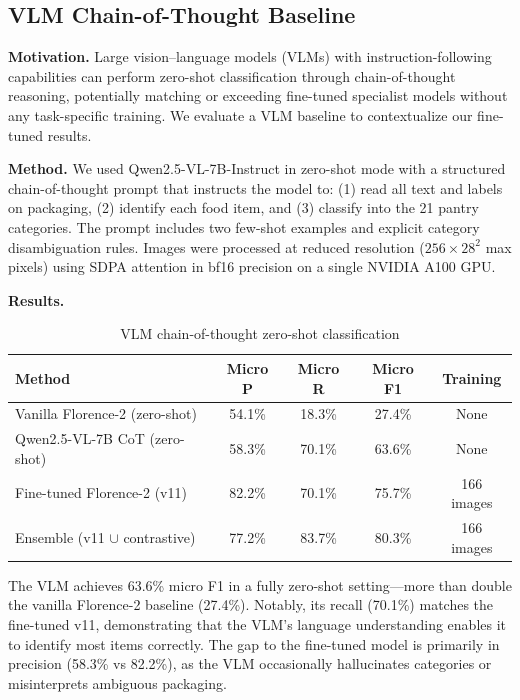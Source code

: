 \subsection{VLM Chain-of-Thought Baseline}
\label{ssec:vlm_cot}

\textbf{Motivation.} Large vision--language models (VLMs) with instruction-following capabilities can perform zero-shot classification through chain-of-thought reasoning, potentially matching or exceeding fine-tuned specialist models without any task-specific training. We evaluate a VLM baseline to contextualize our fine-tuned results.

\textbf{Method.} We used Qwen2.5-VL-7B-Instruct in zero-shot mode with a structured chain-of-thought prompt that instructs the model to: (1) read all text and labels on packaging, (2) identify each food item, and (3) classify into the 21 pantry categories. The prompt includes two few-shot examples and explicit category disambiguation rules. Images were processed at reduced resolution ($256 \times 28^2$ max pixels) using SDPA attention in bf16 precision on a single NVIDIA A100 GPU.

\textbf{Results.}

\begin{table}[h]
\centering
\caption{VLM chain-of-thought zero-shot classification}
\label{tab:vlm_cot}
\begin{tabular}{lcccc}
\toprule
Method & Micro P & Micro R & Micro F1 & Training \\
\midrule
Vanilla Florence-2 (zero-shot) & 54.1\% & 18.3\% & 27.4\% & None \\
Qwen2.5-VL-7B CoT (zero-shot) & 58.3\% & 70.1\% & 63.6\% & None \\
Fine-tuned Florence-2 (v11) & 82.2\% & 70.1\% & 75.7\% & 166 images \\
Ensemble (v11 $\cup$ contrastive) & 77.2\% & 83.7\% & 80.3\% & 166 images \\
\bottomrule
\end{tabular}
\end{table}

The VLM achieves 63.6\% micro F1 in a fully zero-shot setting—more than double the vanilla Florence-2 baseline (27.4\%). Notably, its recall (70.1\%) matches the fine-tuned v11, demonstrating that the VLM's language understanding enables it to identify most items correctly. The gap to the fine-tuned model is primarily in precision (58.3\% vs 82.2\%), as the VLM occasionally hallucinates categories or misinterprets ambiguous packaging.

